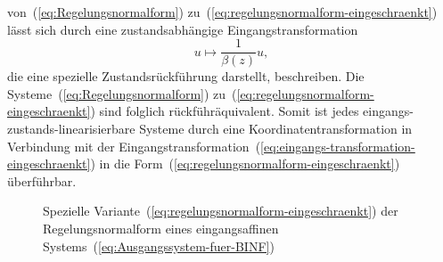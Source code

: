von~(\ref{eq:Regelungsnormalform}) zu~(\ref{eq:regelungsnormalform-eingeschraenkt})
lässt sich durch eine zustands\-abhängige Eingangstransformation
\begin{equation}
u\mapsto\frac{1}{\beta(z)}u,\label{eq:eingangs-transformation-eingeschraenkt}
\end{equation}
die eine spezielle Zustandsrückführung darstellt, beschreiben. Die
Systeme~(\ref{eq:Regelungsnormalform}) zu~(\ref{eq:regelungsnormalform-eingeschraenkt})
sind folglich rückführäquivalent. Somit ist jedes eingangs-zustands-linearisierbare
Systeme durch eine Koordinatentransformation in Verbindung mit der
Eingangstransformation~(\ref{eq:eingangs-transformation-eingeschraenkt})
in die Form~(\ref{eq:regelungsnormalform-eingeschraenkt}) überführbar.

\begin{figure}
\begin{centering}
\resizebox{0.85\textwidth}{!}{}
\par\end{centering}
\caption{Spezielle Variante~(\ref{eq:regelungsnormalform-eingeschraenkt})
der Regelungsnormalform eines eingangsaffinen Systems~(\ref{eq:Ausgangssystem-fuer-BINF})\label{fig:regelungsnormalform-eingeschraenkt}}
\end{figure}

